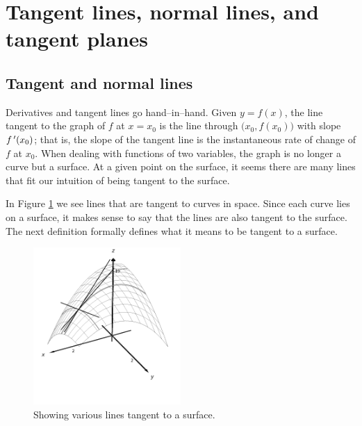 \fi

\section{Tangent lines, normal lines, and tangent planes}\label{sec:multi_tangent}

\subsection{Tangent and normal lines}
Derivatives and tangent lines go hand--in--hand. Given $y=f(x)$, the line tangent to the graph of $f$ at $x=x_0$ is the line through $\big(x_0,f(x_0)\big) $ with slope $f\,'(x_0)$; that is, the slope of the tangent line is the instantaneous rate of change of $f$ at $x_0$. When dealing with functions of two variables, the graph is no longer a curve but a surface. At a given point on the surface, it seems there are many lines that fit our intuition of being tangent to the surface. 

In Figure \ref{fig_multi_var_17} we see lines that are tangent to curves in space. Since each curve lies on a  surface, it makes sense to say that the lines are also tangent to the surface. The next definition formally defines what it means to be tangent to a surface. %

\begin{figure}[H]
	\begin{center}
			\includegraphics[width=0.5\textwidth]{fig_multi_var_17}
	\caption{Showing various lines tangent to a surface.}
	\label{fig_multi_var_17}
	\end{center}
\end{figure}






